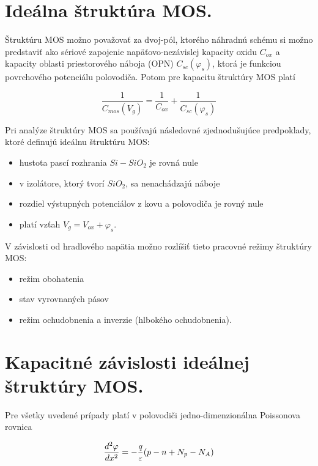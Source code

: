 \section{Ideálna štruktúra MOS.}

Štruktúru MOS možno považovať za dvoj-pól, ktorého náhradnú schému si
možno predstaviť ako sériové zapojenie napäťovo-nezávislej kapacity
oxidu $C_{ox}$ a kapacity oblasti priestorového náboja (OPN)
$C_{sc}(\varphi_{s})$, ktorá je funkciou povrchového potenciálu
polovodiča. Potom pre kapacitu štruktúry MOS platí~\cite{I.1}

\begin{equation}\label{eq:1.1}
  \frac{1}{C_{mos}(V_g)} = \frac{1}{C_{ox}} + \frac{1}{C_{sc}(\varphi_s)}
\end{equation}

Pri analýze štruktúry MOS sa používajú následovné zjednodušujúce
predpoklady, ktoré definujú ideálnu štruktúru MOS\@:

\begin{itemize}
\item hustota pascí rozhrania $Si-SiO_2$ je rovná nule 
\item v izolátore, ktorý tvorí $SiO_2$, sa nenachádzajú náboje 
\item rozdiel výstupných potenciálov z kovu a polovodiča je rovný nule
\item platí vzťah $V_{g}=V_{ox}+\varphi_{s}$.
\end{itemize}

\noindent V závislosti od hradlového napätia možno rozlíšiť tieto
pracovné režimy štruktúry MOS\@:

\begin{itemize}
\item režim obohatenia
\item stav vyrovnaných pásov
\item režim ochudobnenia a inverzie (hlbokého ochudobnenia).
\end{itemize}

\section{Kapacitné závislosti ideálnej štruktúry MOS.}

Pre všetky uvedené prípady platí v polovodiči jedno-dimenzionálna
Poissonova rovnica

\begin{equation}\label{eq:1.2}\index{Poissonova rovnica}
  \frac{d^2\varphi}{dx^2} = -\frac{q}{\varepsilon}(p-n+N_{p}-N_{A})
\end{equation}

